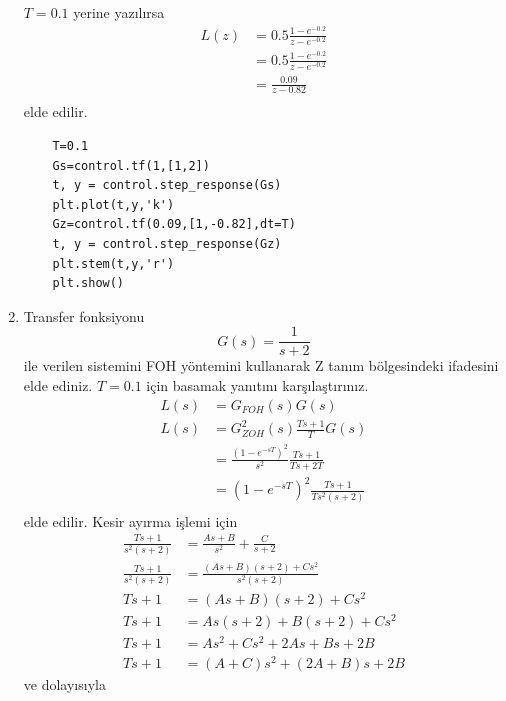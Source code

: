 \begin{enumerate}
    $T=0.1$ yerine yazılırsa
    \begin{equation}
    \begin{split}
        L(z)&=0.5\frac{1-e^{-0.2}}{z-e^{-0.2}}\\
        &=0.5\frac{1-e^{-0.2}}{z-e^{-0.2}}\\
        &=\frac{0.09}{z-0.82}\\
    \end{split}
    \end{equation}
    elde edilir.
    \begin{lstlisting}
    T=0.1
    Gs=control.tf(1,[1,2])
    t, y = control.step_response(Gs)
    plt.plot(t,y,'k')
    Gz=control.tf(0.09,[1,-0.82],dt=T)
    t, y = control.step_response(Gz)
    plt.stem(t,y,'r')
    plt.show()
    \end{lstlisting}
    \item Transfer fonksiyonu 
    \begin{equation}
        G(s)=\frac{1}{s+2}
    \end{equation}
    ile verilen sistemini FOH yöntemini kullanarak Z tanım bölgesindeki ifadesini elde ediniz. $T=0.1$ için basamak yanıtını karşılaştırınız.
    \begin{equation}
    \begin{split}
        L(s)&=G_{FOH}(s)G(s)\\
        L(s)&=G_{ZOH}^2(s)\frac{Ts+1}{T}G(s)\\
        &=\frac{(1-e^{-sT})^2}{s^2}\frac{Ts+1}{Ts+2T}\\
        &=(1-e^{-sT})^2\frac{Ts+1}{Ts^2(s+2)}\\
    \end{split}
    \end{equation}
    elde edilir. Kesir ayırma işlemi için
    \begin{equation}
    \begin{split}
        \frac{Ts+1}{s^2(s+2)}&=\frac{As+B}{s^2}+\frac{C}{s+2}\\
        \frac{Ts+1}{s^2(s+2)}&=\frac{(As+B)(s+2)+Cs^2}{s^2(s+2)}\\
        Ts+1&=(As+B)(s+2)+Cs^2\\
        Ts+1&=As(s+2)+B(s+2)+Cs^2\\
        Ts+1&=As^2+Cs^2+2As+Bs+2B\\
        Ts+1&=(A+C)s^2+(2A+B)s+2B
    \end{split}
    \end{equation}
    ve dolayısıyla
    \begin{equation}

\end{equation}
\end{enumerate}
